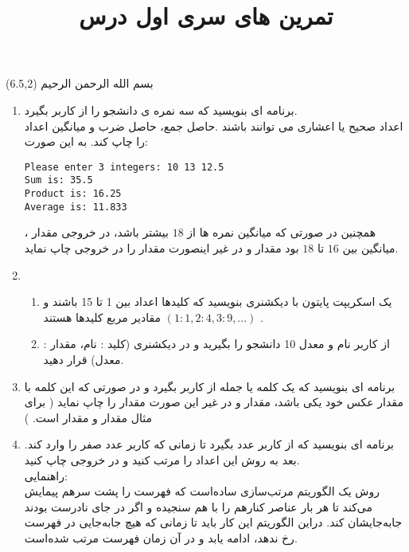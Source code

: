 \documentclass[oneside]{article}
\title{تمرین های سری اول درس
\lr{Service Based Architecture}
}
\date{\vspace{-5ex}}
\begin{document}
\maketitle

\begin{textblock}{5}(6.5,2)\nastaliqfont
\noindent\Large
بسم الله الرحمن الرحیم
\end{textblock}

\begin{enumerate}
\item
برنامه ای بنویسید که سه نمره ی دانشجو را از کاربر بگیرد.
\\
اعداد صحیح یا اعشاری می توانند باشند .حاصل جمع، حاصل ضرب و میانگین اعداد را چاپ کند. به این صورت:
\\
\begin{latin}
\texttt{Please enter 3 integers: 10 13 12.5} \\
\texttt{Sum is: 35.5 }\\
\texttt{Product is: 16.25 }\\
\texttt{Average is: 11.833}
\end{latin}
همچنین در صورتی که میانگین نمره ها از $18$ بیشتر باشد، در خروجی مقدار ، میانگین بین $16$ تا 
$18$
بود مقدار 
و در غیر اینصورت مقدار
را در خروجی چاپ نماید.
\item
\begin{enumerate}
\item 
یک اسکریپت پایتون با دیکشنری بنویسید که کلیدها اعداد بین 1 تا 15 باشند و مقادیر مربع کلیدها هستند
$(1:1, 2:4, 3:9, ...)$
.
\item
از کاربر نام و معدل 10 دانشجو را بگیرید و در دیکشنری (کلید : نام، مقدار : معدل) قرار دهید.
\end{enumerate}
\item 
برنامه ای بنویسید که یک کلمه یا جمله
از کاربر بگیرد و در صورتی که این
کلمه با مقدار عکس خود یکی باشد، مقدار 
و در غیر این صورت مقدار
را چاپ نماید
(
برای مثال 
مقدار 
و 
مقدار
است.
)

\item
	برنامه ای بنویسید که از کاربر عدد بگیرد تا زمانی که کاربر عدد صفر را وارد کند. بعد به روش
  این اعداد را مرتب کنید و در خروجی چاپ کنید. 
  \\
راهنمایی:
\\
روش
یک الگوریتم مرتب‌سازی ساده‌است که فهرست را پشت سرهم پیمایش می‌کند تا هر بار عناصر کنارهم را با هم سنجیده و اگر در جای نادرست بودند جابه‌جایشان کند. دراین الگوریتم این کار باید تا زمانی که هیچ جابه‌جایی در فهرست رخ ندهد، ادامه یابد و در آن زمان فهرست مرتب شده‌است.


\end{enumerate}
\end{document}
